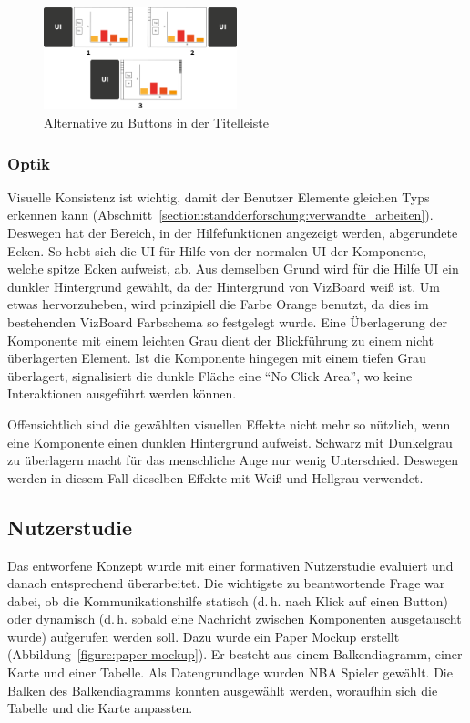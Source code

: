 \documentclass[
	headsepline,
	footsepline,
	fontsize=12pt,
	bibliography=totoc
]{scrbook}
\begin{document}
\begin{figure}[htbp]
   \centering
   \includegraphics[width=0.5\textwidth]{images/konzeption-ui-buttonleiste.png}
   \caption{Alternative zu Buttons in der Titelleiste}
   \label{figure:ui-buttonleiste}
\end{figure}

\subsubsection{Optik}

Visuelle Konsistenz ist wichtig, damit der Benutzer Elemente gleichen Typs erkennen kann (Abschnitt~\ref{section:standderforschung:verwandte_arbeiten}). Deswegen hat der Bereich, in der Hilfefunktionen angezeigt werden, abgerundete Ecken. So hebt sich die UI für Hilfe von der normalen UI der Komponente, welche spitze Ecken aufweist, ab. Aus demselben Grund wird für die Hilfe UI ein dunkler Hintergrund gewählt, da der Hintergrund von VizBoard weiß ist. Um etwas hervorzuheben, wird prinzipiell die Farbe Orange benutzt, da dies im bestehenden VizBoard Farbschema so festgelegt wurde. Eine Überlagerung der Komponente mit einem leichten Grau dient der Blickführung zu einem nicht überlagerten Element. Ist die Komponente hingegen mit einem tiefen Grau überlagert, signalisiert die dunkle Fläche eine \enquote{No Click Area}, wo keine Interaktionen ausgeführt werden können. 

Offensichtlich sind die gewählten visuellen Effekte nicht mehr so nützlich, wenn eine Komponente einen dunklen Hintergrund aufweist. Schwarz mit Dunkelgrau zu überlagern macht für das menschliche Auge nur wenig Unterschied. Deswegen werden in diesem Fall dieselben Effekte mit Weiß und Hellgrau verwendet.

\subsection{Nutzerstudie}
\label{section:konzeption:einleitung:nutzerstudie}

Das entworfene Konzept wurde mit einer formativen Nutzerstudie evaluiert und danach entsprechend überarbeitet. Die wichtigste zu beantwortende Frage war dabei, ob die Kommunikationshilfe statisch (d.\,h. nach Klick auf einen Button) oder dynamisch (d.\,h. sobald eine Nachricht zwischen Komponenten ausgetauscht wurde) aufgerufen werden soll. Dazu wurde ein Paper Mockup \cite{Virzi1996} erstellt (Abbildung~\ref{figure:paper-mockup}). Er besteht aus einem Balkendiagramm, einer Karte und einer Tabelle. Als Datengrundlage wurden NBA Spieler gewählt. Die Balken des Balkendiagramms konnten ausgewählt werden, woraufhin sich die Tabelle und die Karte anpassten.
\end{document}
